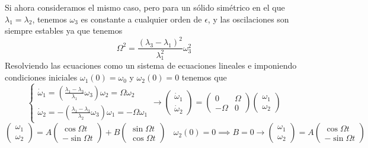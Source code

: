 Si ahora consideramos el mismo caso, pero para un sólido simétrico en el que $\lambda_1 = \lambda_2$, tenemos $\omega_3$ es constante a cualquier orden de $\epsilon$, y las oscilaciones son siempre estables ya que tenemos
\begin{equation} \label{6.1.1}
    \Omega^2 = \frac{(\lambda_3-\lambda_1)^2}{\lambda_1^2} \omega_3^2
\end{equation}
Resolviendo las ecuaciones como un sistema de ecuaciones lineales e imponiendo condiciones iniciales $\omega_1(0)=\omega_0$ y $\omega_2(0)=0$ tenemos que
\[
    \left\{\begin{matrix}
        \dot{\omega}_1  = \left(\frac{\lambda_1-\lambda_3}{\lambda_1} \omega_3\right) \omega_2 = \Omega \omega_2 \\
        \dot{\omega}_2  = -\left(\frac{\lambda_1-\lambda_3}{\lambda_2} \omega_3\right)  \omega_1 = -\Omega \omega_1
    \end{matrix}\right. \rightarrow \left(\begin{matrix}
        \dot{\omega}_1 \\ \dot{\omega}_2
    \end{matrix}\right) = \left(\begin{matrix}
        0 & \Omega \\ -\Omega & 0 
    \end{matrix}\right) \left(\begin{matrix}
        \omega_1 \\ \omega_2
    \end{matrix}\right)
\]
\begin{equation} \label{6.1.1}
    \left(\begin{matrix}
        \omega_1 \\ \omega_2
    \end{matrix}\right) = A \left(\begin{matrix}
        \cos{\Omega t} \\ -\sin{\Omega t}
    \end{matrix}\right) + B \left(\begin{matrix}
        \sin{\Omega t} \\ \cos{\Omega t}
    \end{matrix}\right) \ \ \ \ \omega_2(0) = 0 \implies B=0 \rightarrow \left(\begin{matrix}
        \omega_1 \\ \omega_2
    \end{matrix}\right) = A \left(\begin{matrix}
        \cos{\Omega t} \\ -\sin{\Omega t}
    \end{matrix}\right)
\end{equation}

